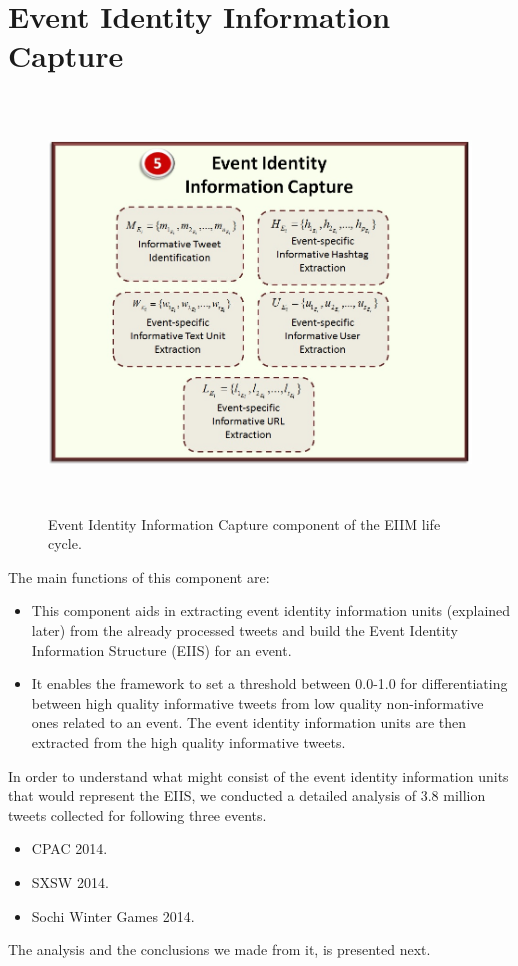 \section{Event Identity Information Capture\label{infocapture}}

\begin{figure}[htbp]
  \caption{Event Identity Information Capture component of the EIIM life cycle.}
  \centering
    \includegraphics[width=14cm,height=11cm]{Figures/EventIdentityCapture.jpg}
\end{figure}

The main functions of this component are:
\begin{itemize}
\item This component aids in extracting event identity information units (explained later) from the already processed tweets and build the Event Identity Information Structure (EIIS) for an event.
\item It enables the framework to set a threshold between 0.0-1.0 for differentiating between high quality informative tweets from low quality non-informative ones related to an event. The event identity information units are then extracted from the high quality informative tweets.
\end{itemize}
  
In order to understand what might consist of the event identity information units that would represent the EIIS, we conducted a detailed analysis of 3.8 million tweets collected for following three events. 
\begin{itemize}
\item CPAC 2014.
\item SXSW 2014.
\item Sochi Winter Games 2014.
\end{itemize}
The analysis and the conclusions we made from it, is presented next.

